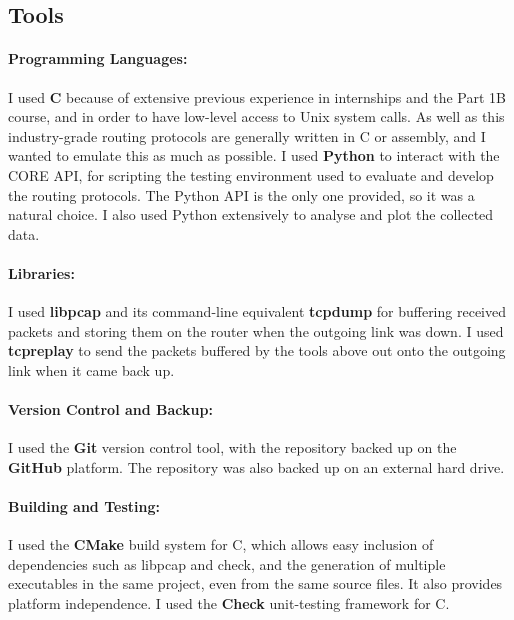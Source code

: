 \documentclass[withindex,glossary,openany]{cam-thesis}
\begin{document}
\subsection{Tools}

\paragraph{Programming Languages:}

I used \textbf{C} because of extensive previous experience in internships and the Part 1B course, and in order to have low-level access to Unix system calls. As well as this industry-grade routing protocols are generally written in C or assembly, and I wanted to emulate this as much as possible. I used \textbf{Python} to interact with the CORE API, for scripting the testing environment used to evaluate and develop the routing protocols. The Python API is the only one provided, so it was a natural choice. I also used Python extensively to analyse and plot the collected data.

\paragraph{Libraries:}

I used \textbf{libpcap} and its command-line equivalent \textbf{tcpdump} \cite{TCPDUMP} for buffering received packets and storing them on the router when the outgoing link was down. I used \textbf{tcpreplay} \cite{TCPREPLAY} to send the packets buffered by the tools above out onto the outgoing link when it came back up.

\paragraph{Version Control and Backup:}

I used the \textbf{Git} version control tool, with the repository backed up on the \textbf{GitHub} platform. The repository was also backed up on an external hard drive.

\paragraph{Building and Testing:}

I used the \textbf{CMake} build system for C, which allows easy inclusion of dependencies such as libpcap and check, and the generation of multiple executables in the same project, even from the same source files. It also provides platform independence. I used the \textbf{Check} unit-testing framework for C.
\end{document}
